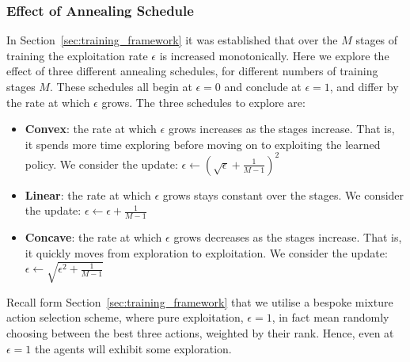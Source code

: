 \documentclass{article}
\begin{document}
\subsubsection{Effect of Annealing Schedule}\label{sec:tune_annealing}
In Section~\ref{sec:training_framework} it was established that over the $M$
stages of training the exploitation rate $\epsilon$ is increased monotonically.
Here we explore the effect of three different annealing schedules, for different
numbers of training stages $M$.
These schedules all begin at $\epsilon = 0$ and conclude at $\epsilon = 1$, and
differ by the rate at which $\epsilon$ grows.
The three schedules to explore are:

\begin{itemize}
  \item \textbf{Convex}: the rate at which $\epsilon$ grows increases as the
  stages increase. That is, it spends more time exploring before moving on to
  exploiting the learned policy. We consider the update:
  $\epsilon \leftarrow \left(\sqrt{\epsilon} + \frac{1}{M-1}\right)^2$
  \item \textbf{Linear}: the rate at which $\epsilon$ grows stays constant over
  the stages. We consider the update:
  $\epsilon \leftarrow \epsilon + \frac{1}{M-1}$
  \item \textbf{Concave}: the rate at which $\epsilon$ grows decreases as the
  stages increase. That is, it quickly moves from exploration to exploitation.
  We consider the update:
  $\epsilon \leftarrow \sqrt{\epsilon^2 + \frac{1}{M-1}}$
\end{itemize}

Recall form Section~\ref{sec:training_framework} that we utilise a bespoke
mixture action selection scheme, where pure exploitation, $\epsilon = 1$, in
fact mean randomly choosing between the best three actions, weighted by their
rank.
Hence, even at $\epsilon = 1$ the agents will exhibit some exploration.
\end{document}
